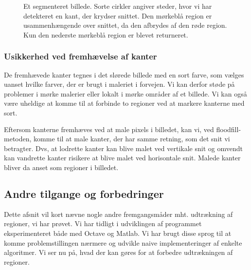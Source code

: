 {\begin{figure}[t]
    \setlength\fboxsep{0pt}
    \setlength\fboxrule{0.5pt}
    \centering
    \caption[]{Et segmenteret billede. Sorte cirkler angiver steder,
    hvor vi har detekteret en kant, der krydser snittet. Den mørkeblå
    region er usammenhængende over snittet, da den afbrydes af den røde
    region. Kun den nederste mørkeblå region er blevet returneret.}
    \label{usammenhaengende_region}
\end{figure}

\subsubsection{Usikkerhed ved fremhævelse af kanter}
De fremhævede kanter tegnes i det slørede billede med en sort farve, som
vælges uanset hvilke farver, der er brugt i maleriet i forvejen. Vi kan
derfor støde på problemer i mørke malerier eller lokalt i mørke områder
af et billede. Vi kan også være uheldige at komme til at forbinde to
regioner ved at markere kanterne med sort.

Eftersom kanterne fremhæves ved at male pixels i billedet, kan vi, ved
floodfill-metoden, komme til at male kanter, der har samme retning, som
det snit vi betragter. Dvs, at lodrette kanter kan blive malet ved
vertikale snit og omvendt kan vandrette kanter risikere at blive malet
ved horisontale snit. Malede kanter bliver da anset som regioner i
billedet.

\subsection{Andre tilgange og forbedringer}
Dette afsnit vil kort nævne nogle andre fremgangsmåder mht. udtrækning
af regioner, vi har prøvet. Vi har tidligt i udviklingen af programmet
eksperimenteret både med Octave og Matlab. Vi har brugt disse sprog til
at komme problemstillingen nærmere og udvikle naive implementeringer af
enkelte algoritmer. Vi ser nu på, hvad der kan gøres for at forbedre
udtrækningen af regioner.

}

